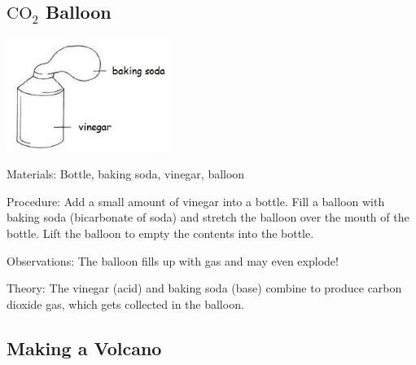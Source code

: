 \begin{multicols}{2}
\subsection{$\mathrm{CO_2}$ Balloon}

\begin{center}
\includegraphics[width=0.4\textwidth]{./img/vso/co2-balloon.jpg}
\end{center}

\begin{description*}
\item[Materials:]{Bottle, baking soda, vinegar, balloon}
\item[Procedure:]{Add a small amount of vinegar into a bottle. Fill a balloon with baking soda (bicarbonate of soda) and stretch the balloon over the mouth of the bottle. Lift the balloon to empty the contents into the bottle.}
\item[Observations:]{The balloon fills up with gas and may even explode!}
\item[Theory:]{The vinegar (acid) and baking soda (base) combine to produce carbon dioxide gas, which gets collected in the balloon.}
\end{description*}

\subsection{Making a Volcano} %



\end{multicols}
